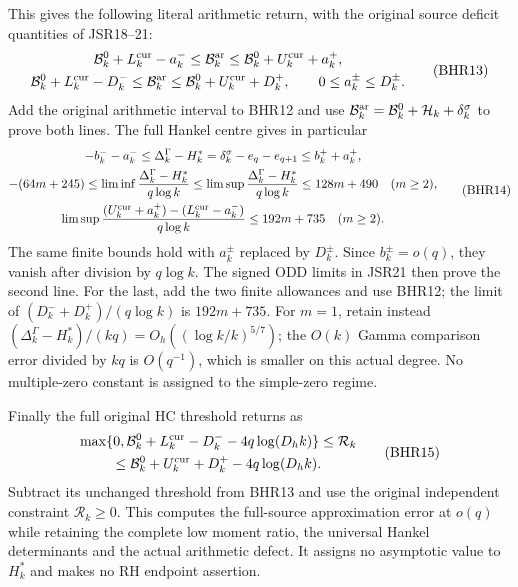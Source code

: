 \documentclass[11pt,a4paper]{article}
\begin{document}
This gives the following literal arithmetic return, with
the original source deficit quantities of JSR18--21:
\[
\begin{gathered}
 \mathcal B_k^0+L_k^{\rm cur}-a_k^-
 \leq\mathcal B_k^{\rm ar}
 \leq\mathcal B_k^0+U_k^{\rm cur}+a_k^+,\\
 \mathcal B_k^0+L_k^{\rm cur}-D_k^-
 \leq\mathcal B_k^{\rm ar}
 \leq\mathcal B_k^0+U_k^{\rm cur}+D_k^+,
 \qquad 0\leq a_k^\pm\leq D_k^\pm.
\end{gathered}\tag{BHR13}
\]
Add the original arithmetic interval to BHR12 and use
$\mathcal B_k^{\rm ar}=\mathcal B_k^0+
\mathcal H_k+\delta_k^\sigma$ to prove both lines.
The full Hankel centre gives in particular
\[
\begin{gathered}
 -b_k^--a_k^-\leq
 \Delta_k^\Gamma-H_k^*=\delta_k^\sigma-e_q-e_{q+1}
 \leq b_k^++a_k^+,\\
 -(64m+245)\leq\liminf\frac{\Delta_k^\Gamma-H_k^*}{q\log k}
 \leq\limsup\frac{\Delta_k^\Gamma-H_k^*}{q\log k}
 \leq128m+490\quad(m\geq2),\\
 \limsup\frac{(U_k^{\rm cur}+a_k^+)
                       -(L_k^{\rm cur}-a_k^-)}{q\log k}
 \leq192m+735\quad(m\geq2).
\end{gathered}\tag{BHR14}
\]
The same finite bounds hold with $a_k^\pm$ replaced by
$D_k^\pm$. Since $b_k^\pm=o(q)$, they vanish after
division by $q\log k$. The signed ODD limits in JSR21
then prove the second line. For the last, add the two
finite allowances and use BHR12; the limit of
$(D_k^-+D_k^+)/(q\log k)$ is $192m+735$.
For $m=1$, retain instead
$(\Delta_k^\Gamma-H_k^*)/(kq)
=O_h((\log k/k)^{5/7})$; the $O(k)$ Gamma comparison
error divided by $kq$ is $O(q^{-1})$, which is smaller
on this actual degree. No multiple-zero constant is
assigned to the simple-zero regime.

Finally the full original HC threshold returns as
\[
\begin{gathered}
 \max\{0,\mathcal B_k^0+L_k^{\rm cur}-D_k^-
                               -4q\log(D_hk)\}
 \leq\mathcal R_k\\
 \leq\mathcal B_k^0+U_k^{\rm cur}+D_k^+
                               -4q\log(D_hk).
\end{gathered}\tag{BHR15}
\]
Subtract its unchanged threshold from BHR13 and use
the original independent constraint $\mathcal R_k\geq0$.
This computes the full-source approximation error at
$o(q)$ while retaining the complete low moment ratio,
the universal Hankel determinants and the actual
arithmetic defect. It assigns no asymptotic value to
$H_k^*$ and makes no RH endpoint assertion.
\end{document}

